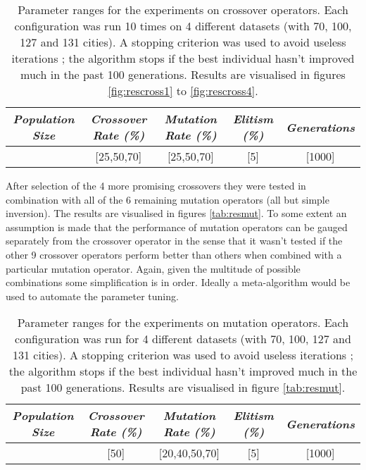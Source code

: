 \begin{table}[h]
\centering
\begin{tabular}{c|c|c|c|c}
\textit{Population Size} & \textit{Crossover Rate (\%)} & \textit{Mutation Rate (\%)} & \textit{Elitism (\%)} & \textit{Generations} \\\hline 
[300] & [25,50,70] & [25,50,70] & [5] & [1000]
\end{tabular}
\caption{Parameter ranges for the experiments on crossover operators. Each configuration was run 10 times on 4 different datasets (with 70, 100, 127 and 131 cities). A stopping criterion was used to avoid useless iterations ; the algorithm stops if the best individual hasn't improved much in the past 100 generations. Results are visualised in figures \ref{fig:rescross1} to \ref{fig:rescross4}.}
\label{tab:par2}
\end{table}

\par\noindent After selection of the 4 more promising crossovers they were tested in combination with all of the 6 remaining mutation operators (all but simple inversion). The results are visualised in figures \ref{tab:resmut}. To some extent an assumption is made that the performance of mutation operators can be gauged separately from the crossover operator in the sense that it wasn't tested if the other 9 crossover operators perform better than others when combined with a particular mutation operator. Again, given the multitude of possible combinations some simplification is in order. Ideally a meta-algorithm would be used to automate the parameter tuning.

\begin{table}[h]
\centering
\begin{tabular}{c|c|c|c|c}
\textit{Population Size} & \textit{Crossover Rate (\%)} & \textit{Mutation Rate (\%)} & \textit{Elitism (\%)} & \textit{Generations} \\\hline 
[300] & [50] & [20,40,50,70] & [5] & [1000]
\end{tabular}
\caption{Parameter ranges for the experiments on mutation operators. Each configuration was run for 4 different datasets (with 70, 100, 127 and 131 cities). A stopping criterion was used to avoid useless iterations ; the algorithm stops if the best individual hasn't improved much in the past 100 generations. Results are visualised in figure \ref{tab:resmut}.}
\label{tab:par3}
\end{table}


